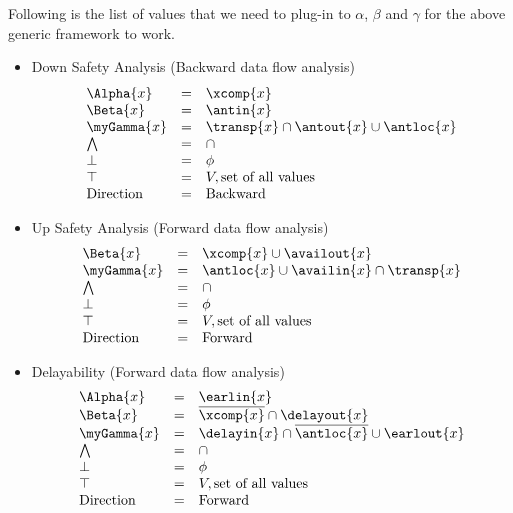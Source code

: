 Following is the list of values that we need to plug-in to $\alpha$,
          $\beta$ and $\gamma$ for the above generic framework
          to work.
\begin{itemize}
\item Down Safety Analysis (Backward data flow analysis)
\begin{equation}
\begin{array}{l c l}
\Alpha{x}     &=& \xcomp{x} \\
\Beta{x}      &=& \antin{x}     \\     
\myGamma{x}   &=& \transp{x} \cap \antout{x} \cup \antloc{x}\\
\bigwedge     &=&  \cap \\
\bot          &=& \phi \\
\top          &=& V, \text{set of all values} \\
\text{Direction}    &=& \text{Backward}
\end{array}
\end{equation}

\item Up Safety Analysis (Forward data flow analysis)
\begin{equation}
\begin{array}{l c l}
\Beta{x}      &=& \xcomp{x} \cup \availout{x}     \\     
\myGamma{x}   &=& \antloc{x} \cup \availin{x} \cap \transp{x}\\
\bigwedge     &=&  \cap \\
\bot          &=& \phi \\
\top          &=& V, \text{set of all values} \\
\text{Direction}    &=& \text{Forward}
\end{array}
\end{equation}

\item Delayability (Forward data flow analysis)
\begin{equation}
\begin{array}{l c l}
\Alpha{x}     &=& \earlin{x} \\
\Beta{x}      &=& \overline{\xcomp{x}} \cap \delayout{x}     \\     
\myGamma{x}   &=& \delayin{x} \cap \overline{\antloc{x}} \cup \earlout{x}\\
\bigwedge     &=&  \cap \\
\bot          &=& \phi \\
\top          &=& V, \text{set of all values} \\
\text{Direction}    &=& \text{Forward}
\end{array}
\end{equation}


\end{itemize}
